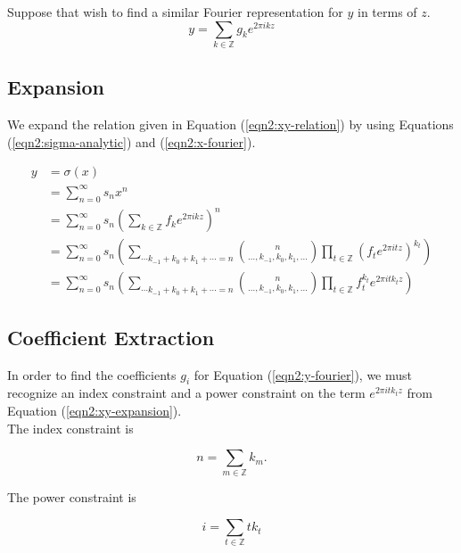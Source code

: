\documentclass{article}
\begin{document}
    Suppose that wish to find a similar Fourier representation for $y$ in terms of $z$.
    \begin{equation}
        y = \sum_{k \in \mathbb{Z}} g_k e^{2\pi i k z}
        \label{eqn2:y-fourier}
    \end{equation}

    \subsection{Expansion}
    We expand the relation given in Equation (\ref{eqn2:xy-relation}) by using Equations (\ref{eqn2:sigma-analytic}) and (\ref{eqn2:x-fourier}).

    \begin{align}
        y &= \sigma(x) \nonumber \\
        &= \sum_{n=0}^{\infty} s_n x^n \nonumber \\
        &= \sum_{n=0}^{\infty} s_n \left(\sum_{k \in \mathbb{Z}} f_k e^{2\pi i k z}\right)^n \nonumber \\
        &= \sum_{n=0}^{\infty} s_n \left(\sum_{\cdots k_{-1} + k_{0} + k_{1} + \cdots = n} \binom{n}{\ldots, k_{-1}, k_{0}, k_{1}, \ldots} \prod_{t \in \mathbb{Z}} \left(f_t e^{2\pi i t z}\right)^{k_t} \right) \nonumber \\
        &= \sum_{n=0}^{\infty} s_n \left(\sum_{\cdots k_{-1} + k_{0} + k_{1} + \cdots = n} \binom{n}{\ldots, k_{-1}, k_{0}, k_{1}, \ldots} \prod_{t \in \mathbb{Z}} f_t^{k_t} e^{2\pi i t k_t z} \right)
        \label{eqn2:xy-expansion}
    \end{align}

    \subsection{Coefficient Extraction}

    In order to find the coefficients $g_i$ for Equation (\ref{eqn2:y-fourier}), we must recognize an index constraint and a power constraint on the term $e^{2\pi i t k_t z}$ from Equation (\ref{eqn2:xy-expansion}).\\

    The index constraint is

    \begin{equation}
        n = \sum_{m \in \mathbb{Z}} k_m.
    \end{equation}

    The power constraint is

    \begin{equation}
        i = \sum_{t \in \mathbb{Z}} tk_t
    \end{equation}
\end{document}
